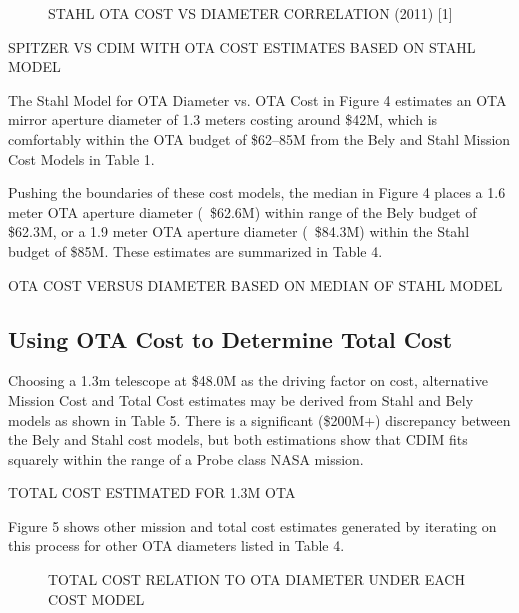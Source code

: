 \documentclass{ws-jai}
\begin{document}
\begin{figure}
  \caption{STAHL OTA COST VS DIAMETER CORRELATION (2011) [1]
\label{fig:cost-stahl-ota-cost-vs-diameter}
}
\end{figure}

\begin{table}
  \caption{SPITZER VS CDIM WITH OTA COST ESTIMATES BASED ON STAHL MODEL
\label{tab:cost-spitzer-vs-CDIM}
}
\end{table}

The Stahl Model for OTA Diameter vs. OTA Cost in Figure 4 estimates an OTA mirror aperture diameter of 1.3 meters costing around \$42M, which is comfortably within the OTA budget of \$62--85M from the Bely and Stahl Mission Cost Models in Table 1.

Pushing the boundaries of these cost models, the median in Figure 4 places a 1.6 meter OTA aperture diameter (~\$62.6M) within range of the Bely budget of \$62.3M, or a 1.9 meter OTA aperture diameter (~\$84.3M) within the Stahl budget of \$85M.
These estimates are summarized in Table 4.

\begin{table}
  \caption{OTA COST VERSUS DIAMETER BASED ON MEDIAN OF STAHL MODEL
\label{tab:cost-ota-vs-dia-CDIM}
}
\end{table}

\subsection{Using OTA Cost to Determine Total Cost}
Choosing a 1.3m telescope at \$48.0M as the driving factor on cost, alternative Mission Cost and Total Cost estimates may be derived from Stahl and Bely models as shown in Table 5.
There is a significant (\$200M+) discrepancy between the Bely and Stahl cost models, but both estimations show that CDIM fits squarely within the range of a Probe class NASA mission.

\begin{table}
  \caption{TOTAL COST ESTIMATED FOR 1.3M OTA
\label{tab:cost-tota-1.3m}
}
\end{table}

Figure 5 shows other mission and total cost estimates generated by iterating on this process for other OTA diameters listed in Table 4.

\begin{figure}
  \caption{TOTAL COST RELATION TO OTA DIAMETER UNDER EACH COST MODEL
\label{fig:cost-total-compare-models}
}
\end{figure}
\end{document}
